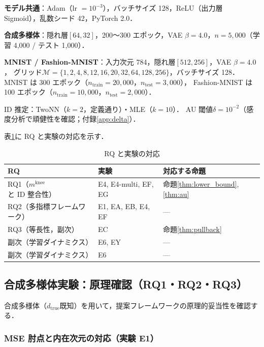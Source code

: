 \documentclass[11pt,a4paper]{jsarticle}
\newcommand{\dtrue}{d_{\mathrm{true}}}
\newcommand{\mknee}{m^{\mathrm{knee}}}
\begin{document}
\textbf{モデル共通}：Adam（lr $= 10^{-3}$），バッチサイズ 128，ReLU（出力層 Sigmoid），乱数シード 42，PyTorch 2.0．

\textbf{合成多様体}：隠れ層$[64, 32]$，200〜300 エポック，VAE $\beta = 4.0$，$n = 5{,}000$（学習 4,000 / テスト 1,000）．

\textbf{MNIST / Fashion-MNIST}：入力次元 784，隠れ層$[512, 256]$，VAE $\beta = 4.0$，
グリッド$\mathcal{M} = \{1,2,4,8,12,16,20,32,64,128,256\}$，バッチサイズ 128．
MNIST は 300 エポック（$n_{\mathrm{train}} = 20{,}000$，$n_{\mathrm{test}} = 3{,}000$），
Fashion-MNIST は 100 エポック（$n_{\mathrm{train}} = 10{,}000$，$n_{\mathrm{test}} = 2{,}000$）．

ID 推定：TwoNN（$k=2$，定義通り）・MLE（$k=10$）\cite{facco2017twonn,levina2005mle}．
AU 閾値$\delta = 10^{-2}$\cite{lucas2019elbo}（感度分析で頑健性を確認；付録\ref{app:delta}）．

表\ref{tab:rq_exp_map}に RQ と実験の対応を示す．

\begin{table}[H]
\centering
\caption{RQ と実験の対応}
\label{tab:rq_exp_map}
\small
\begin{tabular}{lll}
\toprule
RQ & 実験 & 対応する命題 \\
\midrule
RQ1（$\mknee$と ID 整合性） & E4, E4-multi, EF, EG & 命題\ref{thm:lower_bound},\ref{thm:au} \\
RQ2（多指標フレームワーク） & E1, EA, EB, E4, EF & --- \\
RQ3（等長性，副次） & EC & 命題\ref{thm:pullback} \\
副次（学習ダイナミクス） & E6, EY & --- \\
副次（学習ダイナミクス） & E6 & --- \\
\bottomrule
\end{tabular}
\end{table}

\subsection{合成多様体実験：原理確認（RQ1・RQ2・RQ3）}\label{sec:exp_synthetic}

合成多様体（$\dtrue$既知）を用いて，提案フレームワークの原理的妥当性を確認する．

\subsubsection{MSE 肘点と内在次元の対応（実験 E1）}
\end{document}
